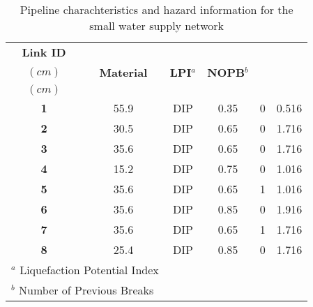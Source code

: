 \begin{table}[H]
	\centering
	\caption{Pipeline charachteristics and hazard information for the small water supply network}
	\label{table:small_WSN_edges}
	\small
	\begin{tabular}{cccccc}
    	\hline
    	\textbf{Link ID} & \Centerstack{\textbf{Diameter} \\ $(cm)$} & \textbf{Material} & \textbf{LPI$^a$} & \textbf{NOPB$^b$} & \Centerstack{\textbf{PGD} \\ $(cm)$}\\ 
            \hline
    	\textbf{1} & 55.9 & DIP & 0.35 & 0 & 0.516\\
    	\textbf{2} & 30.5 & DIP & 0.65 & 0 & 1.716\\
    	\textbf{3} & 35.6 & DIP & 0.65 & 0 & 1.716\\
    	\textbf{4} & 15.2 & DIP & 0.75 & 0 & 1.016\\
            \textbf{5} & 35.6 & DIP & 0.65 & 1 & 1.016\\
            \textbf{6} & 35.6 & DIP & 0.85 & 0 & 1.916\\
            \textbf{7} & 35.6 & DIP & 0.65 & 1 & 1.716\\
            \textbf{8} & 25.4 & DIP & 0.85 & 0 & 1.716\\
    	\hline
            \multicolumn{2}{l}{\footnotesize $^a$ Liquefaction Potential Index} \\
            \multicolumn{2}{l}{\footnotesize $^b$ Number of Previous Breaks}
	\end{tabular}
\end{table}